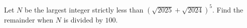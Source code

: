 Let $N$ be the largest integer strictly less than $(\sqrt{2025}+\sqrt{2024})^5$. Find the remainder when $N$ is divided by $100$.
